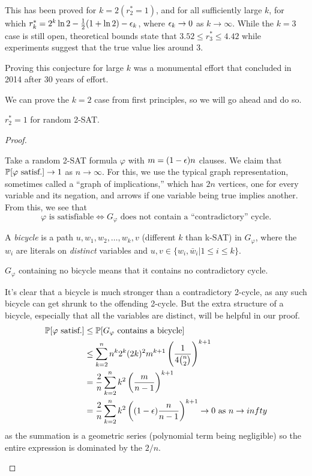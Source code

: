 \documentclass[11 pt]{scrartcl}
\begin{document}
This has been proved for $k = 2 (r_2^* = 1)$, and for all sufficiently large $k$, for which $r_k^* = 2^k \ln 2 - \frac{1}{2} (1 + \ln 2) - \epsilon_k$, where $\epsilon_k \to 0$ as $k\to \infty$. While the $k = 3$ case is still open, theoretical bounds state that $3.52 \leq r_3^* \leq 4.42$ while experiments suggest that the true value lies around 3.  

Proving this conjecture for large $k$ was a monumental effort that concluded in 2014 after 30 years of effort.  

We can prove the $k = 2$ case from first principles, so we will go ahead and do so. 
\begin{theorem}
    $r_2^* = 1$ for random 2-SAT. 
    \label{thm:ksat}
\end{theorem}
\begin{proof}
    \begin{enumerate}[(i)]
        \ii Take a random 2-SAT formula $\varphi$ with $m = (1-\epsilon)n$ clauses. We claim that $\mathbb P[\varphi\text{ satisf.}] \to 1$ as $n \to \infty$. For this, we use the typical graph representation, sometimes called a ``graph of implications,'' which has $2n$ vertices, one for every variable and its negation, and arrows if one variable being true implies another. From this, we see that 
        \[ \varphi\text{ is satisfiable} \iff G_{\varphi}\text{ does not contain a ``contradictory'' cycle}.\] 

            A \emph{bicycle} is a path $u, w_1, w_2, \dots, w_k, v$ (different $k$ than k-SAT) in $G_\varphi$, where the $w_i$ are literals on \emph{distinct} variables and $u,v \in \{w_i, \bar{w}_i | 1 \leq i \leq k\}.$ 

            \begin{claim}
                $G_\varphi$ containing no bicycle means that it contains no contradictory cycle.  
            \end{claim}

            It's clear that a bicycle is much stronger than a contradictory 2-cycle, as any such bicycle can get shrunk to the offending 2-cycle. But the extra structure of a bicycle, especially that all the variables are distinct, will be helpful in our proof. 
            \begin{align*}
                \mathbb P[\varphi\text{ satisf.}] &\leq \mathbb P[G_\varphi\text{ contains a bicycle}] \\ 
                                            &\leq \sum_{k=2}^n n^k 2^k (2k)^2 m^{k+1} \left(\dfrac{1}{4\binom{n}{2}}\right)^{k+1} \\ 
                                            &= \dfrac{2}{n} \sum_{k=2}^n k^2 \left(\dfrac{m}{n-1}\right)^{k+1} \\ 
                                            &= \dfrac{2}{n} \sum_{k=2}^n k^2 \left((1-\epsilon) \dfrac{n}{n-1}\right)^{k+1} \to 0 \text{ as } n \to infty 
            \end{align*}
            as the summation is a geometric series (polynomial term being negligible) so the entire expression is dominated by the $2/n$. 


\end{enumerate}
\end{proof}
\end{document}
